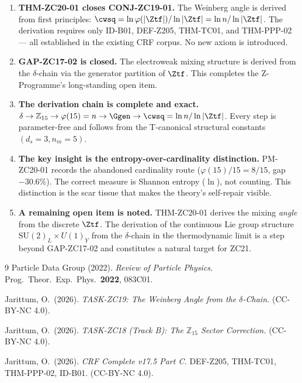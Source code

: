 \documentclass[12pt, a4paper]{article}
\begin{document}
\begin{enumerate}[leftmargin=*]

\item \textbf{THM-ZC20-01 closes CONJ-ZC19-01.}
  The Weinberg angle is derived from first principles:
  $\cwsq = \ln\varphi(|\Ztf|)/\ln|\Ztf| = \ln n/\ln|\Ztf|$.
  The derivation requires only ID-B01, DEF-Z205, THM-TC01, and
  THM-PPP-02 --- all established in the existing CRF corpus.
  No new axiom is introduced.

\item \textbf{GAP-ZC17-02 is closed.}
  The electroweak mixing structure is derived from the
  $\delta$-chain via the generator partition of $\Ztf$.
  This completes the Z-Programme's long-standing open item.

\item \textbf{The derivation chain is complete and exact.}
  $\delta \to \mathbb{Z}_{15} \to \varphi(15) = n
  \to \Ggen \to \cwsq = \ln n/\ln|\Ztf|$.
  Every step is parameter-free and follows from the T-canonical
  structural constants $(d_s = 3, n_m = 5)$.

\item \textbf{The key insight is the entropy-over-cardinality
  distinction.}
  PM-ZC20-01 records the abandoned cardinality route
  ($\varphi(15)/15 = 8/15$, gap $-30.6\%$).
  The correct measure is Shannon entropy ($\ln$), not counting.
  This distinction is the scar tissue that makes the theory's
  self-repair visible.

\item \textbf{A remaining open item is noted.}
  THM-ZC20-01 derives the mixing \emph{angle} from the discrete
  $\Ztf$. The derivation of the continuous Lie group structure
  $\mathrm{SU}(2)_L\times U(1)_Y$ from the $\delta$-chain
  in the thermodynamic limit is a step beyond GAP-ZC17-02
  and constitutes a natural target for ZC21.

\end{enumerate}

\bigskip
\begin{thebibliography}{9}
  Particle Data Group (2022). \textit{Review of Particle Physics.}
  Prog.\ Theor.\ Exp.\ Phys.\ \textbf{2022}, 083C01.

  Jarittum, O.\ (2026).
  \textit{TASK-ZC19: The Weinberg Angle from the $\delta$-Chain.}
  (CC-BY-NC 4.0).

  Jarittum, O.\ (2026).
  \textit{TASK-ZC18 (Track B): The $\mathbb{Z}_{15}$ Sector Correction.}
  (CC-BY-NC 4.0).

  Jarittum, O.\ (2026).
  \textit{CRF Complete v17.5 Part C.}
  DEF-Z205, THM-TC01, THM-PPP-02, ID-B01.
  (CC-BY-NC 4.0).
\end{thebibliography}
\end{document}
